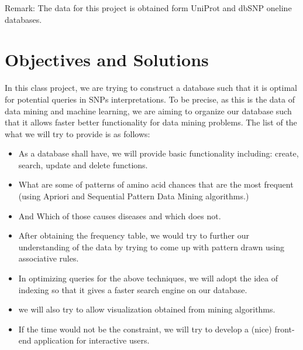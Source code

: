 \documentclass[12pt]{extarticle}
\begin{document}
Remark: The data for this project is obtained form UniProt and dbSNP oneline databases. 

\section*{Objectives and Solutions}
In this class project, we are trying to construct a database such that it is optimal for potential queries in SNPs interpretations. To be precise, as this is the data of data mining and machine learning, we are aiming to organize our database such that it allows faster better functionality for data mining problems. The list of the what we will try to provide is as follows:
\begin{itemize}
\item As a database shall have, we will provide basic functionality including:  create, search, update and delete functions.  
\item What are some of  patterns of amino acid chances that are the most frequent (using Apriori and Sequential Pattern Data Mining algorithms.)
\item And Which of those causes diseases and which does not.
\item After obtaining the frequency table, we would try to further our understanding of the data by trying to come up with pattern drawn using associative rules. 
\item In optimizing queries for the above techniques, we will  adopt the idea of indexing so that it gives a faster search engine on our database. 
\item we will also try to allow visualization  obtained from mining algorithms. 
\item If the time would not be the constraint, we will try to develop a  (nice) front-end application for interactive users. 
\end{itemize}
\end{document}
